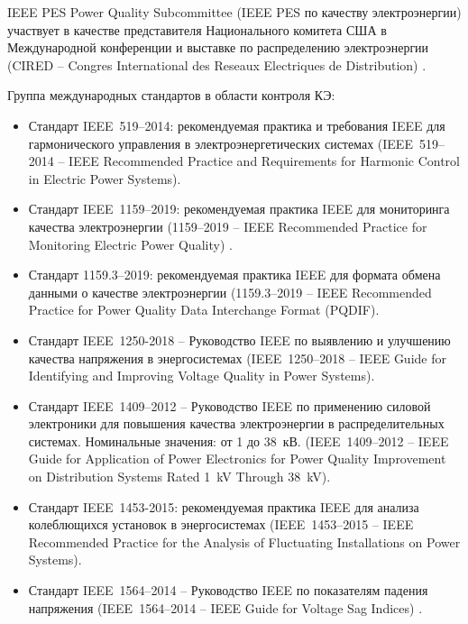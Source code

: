 IEEE PES Power Quality Subcommittee (IEEE PES по качеству электроэнергии) участвует в качестве представителя Национального комитета США в Международной конференции и выставке по распределению электроэнергии (CIRED -- Congres International des Reseaux Electriques de Distribution) \cite{CIRED, CIRED_CONFERENCE}. 


Группа международных стандартов в области контроля КЭ:
\begin{itemize}
	\item Стандарт IEEE~519--2014: рекомендуемая практика и требования IEEE для гармонического управления в электроэнергетических системах (IEEE~519--2014 -- IEEE Recommended Practice and Requirements for Harmonic Control in Electric Power Systems)\cite{IEEE_519-2014}. 
	\item Стандарт IEEE~1159--2019: рекомендуемая практика IEEE для мониторинга качества электроэнергии (1159--2019 -- IEEE Recommended Practice for Monitoring Electric Power Quality) \cite{IEEE_1159-2019}. 
	\item Стандарт 1159.3--2019: рекомендуемая практика IEEE для формата обмена данными о качестве электроэнергии (1159.3--2019 -- IEEE Recommended Practice for Power Quality Data Interchange Format (PQDIF)\cite{IEEE_1159.3-2019}.
	\item Стандарт IEEE~1250-2018 -- Руководство IEEE по выявлению и улучшению качества напряжения в энергосистемах (IEEE~1250--2018 -- IEEE Guide for Identifying and Improving Voltage Quality in Power Systems)\cite{IEEE_1250-2018}.
	\item Стандарт IEEE~1409--2012 -- Руководство IEEE по применению силовой электроники для повышения качества электроэнергии в распределительных системах. Номинальные значения: от 1 до 38~кВ. (IEEE~1409--2012 -- IEEE Guide for Application of Power Electronics for Power Quality Improvement on Distribution Systems Rated 1~kV Through 38~kV)\cite{IEEE_1409-2012}.
	\item Стандарт IEEE~1453-2015: рекомендуемая практика IEEE для анализа колеблющихся установок в энергосистемах (IEEE~1453--2015 -- IEEE Recommended Practice for the Analysis of Fluctuating Installations on Power Systems).
	\item Стандарт IEEE~1564--2014 -- Руководство IEEE по показателям падения напряжения (IEEE~1564--2014 -- IEEE Guide for Voltage Sag Indices) \cite{IEEE_1453-2015}.
\end{itemize}

